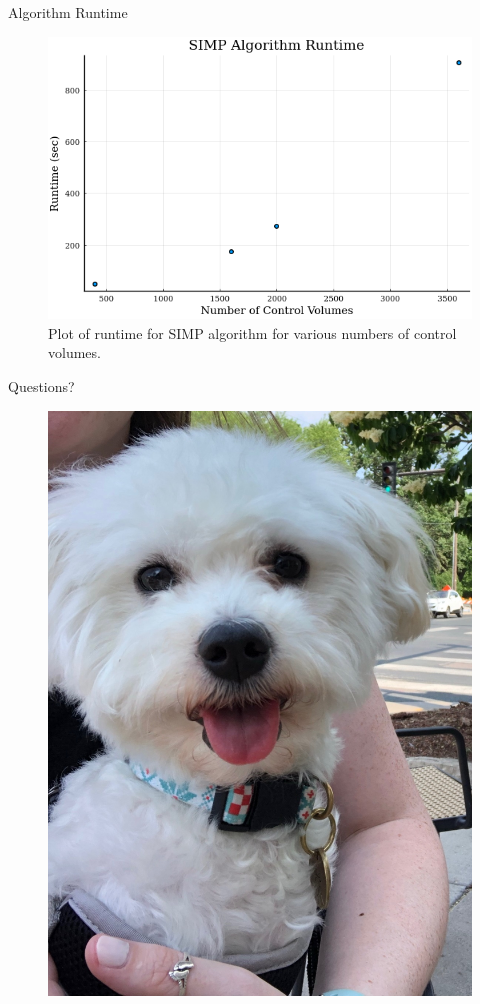 \documentclass[final]{beamer}
\begin{document}
\begin{frame}{Algorithm Runtime}
	\begin{figure}
		\centering
		\includegraphics[width=0.8\linewidth]{SIMP-Runtime.png}
		\caption[SIMP Runtime Plot]{Plot of runtime for SIMP algorithm for various numbers of control volumes.}
		\label{fig:runtime}
	\end{figure}
\end{frame}

\begin{frame}{Questions?}
	\begin{figure}
		\centering
		\includegraphics[height=0.8\textheight]{elske.jpg}
	\end{figure}
\end{frame}
\end{document}

